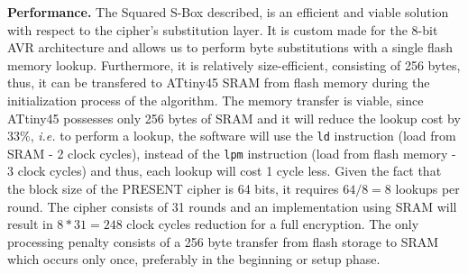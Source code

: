 \documentclass[11pt]{llncs2e} %
\begin{document}
\textbf{Performance.} The Squared S-Box described, is an efficient and viable solution with respect to the cipher's substitution layer. It is custom made for the 8-bit AVR architecture and allows us to perform byte substitutions with a single flash memory lookup. Furthermore, it is relatively size-efficient, consisting of 256 bytes, thus, it can be transfered to ATtiny45 SRAM from flash memory during the initialization process of the algorithm. The memory transfer is viable, since ATtiny45 possesses only 256 bytes of SRAM and it will reduce the lookup cost by 33\%, \emph{i.e.} to perform a lookup, the software will use the \texttt{ld} instruction (load from SRAM - 2 clock cycles), instead of  the \texttt{lpm} instruction (load from flash memory - 3 clock cycles) and thus, each lookup will cost 1 cycle less. Given the fact that the block size of the PRESENT cipher is 64 bits, it requires $64/8=8$ lookups per round. The cipher consists of 31 rounds and an implementation using SRAM will result in $8*31=248$ clock cycles reduction for a full encryption. The only processing penalty consists of a 256 byte transfer from flash storage to SRAM which occurs only once, preferably in the beginning or setup phase.
\end{document}
